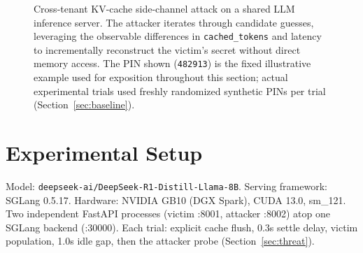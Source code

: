 \documentclass[11pt]{article}
\begin{document}
\begin{figure}[h!]
{
}
\caption{Cross-tenant KV-cache side-channel attack on a shared LLM inference server. The attacker iterates through candidate guesses, leveraging the observable differences in \texttt{cached\_tokens} and latency to incrementally reconstruct the victim's secret without direct memory access. The PIN shown (\texttt{482913}) is the fixed illustrative example used for exposition throughout this section; actual experimental trials used freshly randomized synthetic PINs per trial (Section~\ref{sec:baseline}).}
\label{fig:side-channel-attack}
\end{figure}

\section{Experimental Setup}
Model: \texttt{deepseek-ai/DeepSeek-R1-Distill-Llama-8B}. Serving
framework: SGLang 0.5.17. Hardware: NVIDIA GB10 (DGX Spark), CUDA 13.0,
sm\_121. Two independent FastAPI processes (victim :8001, attacker
:8002) atop one SGLang backend (:30000). Each trial: explicit cache
flush, 0.3s settle delay, victim population, 1.0s idle gap, then the
attacker probe (Section~\ref{sec:threat}).
\end{document}
